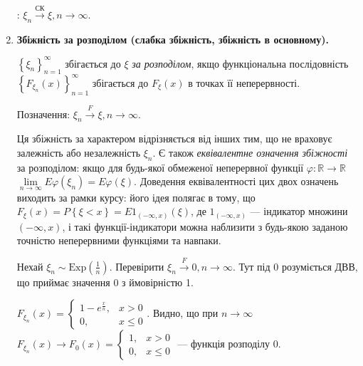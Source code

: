 \begin{enumerate}
    : $\xi_n \overset{\text{СК}}{\longrightarrow} \xi, n \to \infty$.
    \item \textbf{Збіжність за розподілом (слабка збіжність, збіжність в основному).}

    \noindent$\left\{ \xi_n\right\}_{n=1}^{\infty}$ збігається до $\xi$ \emph{за розподілом}, якщо функціональна послідовність
    $\left\{ F_{\xi_n} (x)\right\}_{n=1}^{\infty}$ збігається до $F_{\xi}(x)$ в точках її неперервності.

    Позначення: $\xi_n \overset{F}{\longrightarrow} \xi, n \to \infty$.

    Ця збіжність за характером відрізняється від інших тим, що не враховує залежність або незалежність $\xi_n$.
    Є також \emph{еквівалентне означення збіжності} за розподілом: якщо для будь-якої обмеженої неперервної функції $\varphi : \mathbb{R} \to \mathbb{R}$
    $\underset{n \to \infty}{\lim} E \varphi(\xi_n) = E\varphi(\xi)$.
    Доведення еквівалентності цих двох означень виходить за рамки курсу: його ідея полягає в тому, що $F_{\xi}(x) = P\left\{ \xi < x\right\} = E 1_{(-\infty, x)}(\xi)$,
    де $1_{(-\infty, x)}$ --- індикатор множини $(-\infty, x)$, і такі функції-індикатори можна наблизити з будь-якою заданою точністю неперервними функціями та навпаки.
    \begin{example}
        Нехай $\xi_n \sim \mathrm{Exp}(\frac{1}{n})$. Перевірити $\xi_n \overset{F}{\to} 0, n \to \infty$.
        Тут під 0 розуміється ДВВ, що приймає значення 0 з ймовірністю 1.

        $F_{\xi_n}(x) = \begin{cases}
            1 - e^{\frac{x}{n}}, & x > 0 \\
            0, & x \leq 0
        \end{cases}$. Видно, що при $n \to \infty$ $F_{\xi_n}(x) \to F_0(x) = \begin{cases}
            1, & x > 0 \\
            0, & x \leq 0
        \end{cases}
        $ --- функція розподілу 0.
    \end{example}
\end{enumerate}

